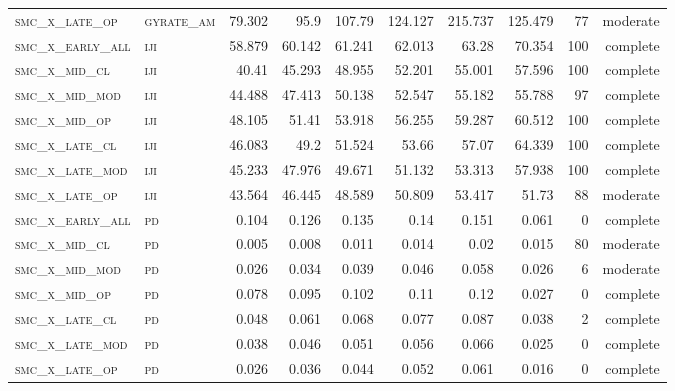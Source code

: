 \begin{landscape}
\begin{center}
\begin{footnotesize}
\begin{longtable}{llrrrrr|rrr}
\textsc{smc\_x\_late\_op  } & \textsc{gyrate\_am}   & 79.302   & 95.9     & 107.79   & 124.127  & 215.737  & 125.479  & 77  & moderate \\
\textsc{smc\_x\_early\_all} & \textsc{iji       }   & 58.879   & 60.142   & 61.241   & 62.013   & 63.28    & 70.354   & 100 & complete \\
\textsc{smc\_x\_mid\_cl   } & \textsc{iji       }   & 40.41    & 45.293   & 48.955   & 52.201   & 55.001   & 57.596   & 100 & complete \\
\textsc{smc\_x\_mid\_mod  } & \textsc{iji       }   & 44.488   & 47.413   & 50.138   & 52.547   & 55.182   & 55.788   & 97  & complete \\
\textsc{smc\_x\_mid\_op   } & \textsc{iji       }   & 48.105   & 51.41    & 53.918   & 56.255   & 59.287   & 60.512   & 100 & complete \\
\textsc{smc\_x\_late\_cl  } & \textsc{iji       }   & 46.083   & 49.2     & 51.524   & 53.66    & 57.07    & 64.339   & 100 & complete \\
\textsc{smc\_x\_late\_mod } & \textsc{iji       }   & 45.233   & 47.976   & 49.671   & 51.132   & 53.313   & 57.938   & 100 & complete \\
\textsc{smc\_x\_late\_op  } & \textsc{iji       }   & 43.564   & 46.445   & 48.589   & 50.809   & 53.417   & 51.73    & 88  & moderate \\
\textsc{smc\_x\_early\_all} & \textsc{pd        }   & 0.104    & 0.126    & 0.135    & 0.14     & 0.151    & 0.061    & 0   & complete \\
\textsc{smc\_x\_mid\_cl   } & \textsc{pd        }   & 0.005    & 0.008    & 0.011    & 0.014    & 0.02     & 0.015    & 80  & moderate \\
\textsc{smc\_x\_mid\_mod  } & \textsc{pd        }   & 0.026    & 0.034    & 0.039    & 0.046    & 0.058    & 0.026    & 6   & moderate \\
\textsc{smc\_x\_mid\_op   } & \textsc{pd        }   & 0.078    & 0.095    & 0.102    & 0.11     & 0.12     & 0.027    & 0   & complete \\
\textsc{smc\_x\_late\_cl  } & \textsc{pd        }   & 0.048    & 0.061    & 0.068    & 0.077    & 0.087    & 0.038    & 2   & complete \\
\textsc{smc\_x\_late\_mod } & \textsc{pd        }   & 0.038    & 0.046    & 0.051    & 0.056    & 0.066    & 0.025    & 0   & complete \\
\textsc{smc\_x\_late\_op  } & \textsc{pd        }   & 0.026    & 0.036    & 0.044    & 0.052    & 0.061    & 0.016    & 0   & complete \\

\end{longtable}
\end{footnotesize}
\end{center}
\end{landscape}
